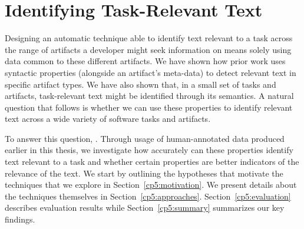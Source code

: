 \setcounter{chapter}{4}
\setcounter{rq}{1}


\chapter{Identifying Task-Relevant Text}
\label{ch:identifying}



Designing an automatic technique able to identify text relevant to a task across the range of artifacts a developer might seek information on means solely using data common to these different artifacts.
We have shown how  prior work uses syntactic properties (alongside an artifact's meta-data)
to detect relevant text in specific artifact types.
We have also shown that, in a small set of tasks and artifacts, task-relevant text might be identified through its semantics.
A natural question that follows is whether we can use these properties to identify relevant text across a wide variety of software tasks and artifacts.




To answer this question, .
Through usage of human-annotated data produced earlier in this thesis, we 
investigate how accurately can these properties identify text relevant to a task and whether certain properties are better indicators of the relevance of the text.
We start by outlining the hypotheses that motivate the techniques that we explore in Section~\ref{cp5:motivation}.
We present details about the techniques themselves in Section~\ref{cp5:approaches}.
Section~\ref{cp5:evaluation} describes evaluation results while
Section~\ref{cp5:summary} summarizes our key findings.






% 
% 

